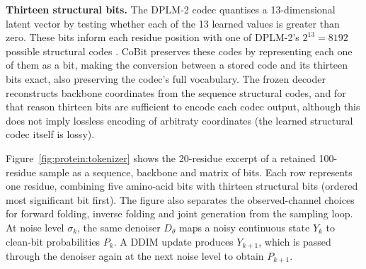 \textbf{Thirteen structural bits.} The DPLM-2 codec quantises a 13-dimensional latent vector by testing whether each of the 13 learned values is greater than zero. These bits inform each residue position with one of DPLM-2's $2^{13}=8192$ possible structural codes \citep{protein:dplm2}. CoBit preserves these codes by representing each one of them as a bit, making the conversion between a stored code and its thirteen bits exact, also preserving the codec's full vocabulary. The frozen decoder reconstructs backbone coordinates from the sequence structural codes, and for that reason thirteen bits are sufficient to encode each codec output, although this does not imply lossless encoding of arbitraty coordinates (the learned structural codec itself is lossy).


Figure~\ref{fig:protein:tokenizer} shows the 20-residue excerpt of a retained 100-residue sample as a sequence, backbone and matrix of bits. Each row represents one residue, combining five amino-acid bits with thirteen structural bits (ordered most significant bit first). The figure also separates the observed-channel choices for forward folding, inverse folding and joint generation from the sampling loop. At noise level $\sigma_k$, the same denoiser $D_\theta$ maps a noisy continuous state $Y_k$ to clean-bit probabilities $P_k$. A DDIM update produces $Y_{k+1}$, which is passed through the denoiser again at the next noise level to obtain $P_{k+1}$.

